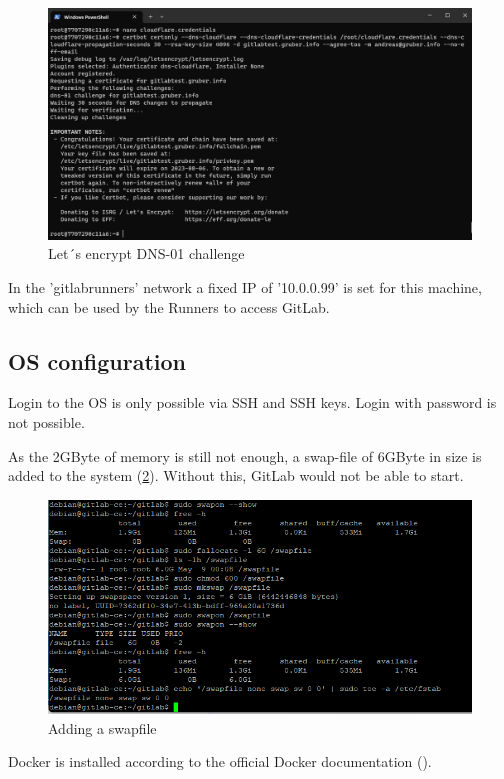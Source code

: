 \begin{figure}[H]
	\centering
	\includegraphics[width=14cm]{images/lets_encrypt.png}
	\caption{Let´s encrypt DNS-01 challenge}
	\label{fig:lets_encrypt}
\end{figure}

In the 'gitlabrunners' network a fixed IP of '10.0.0.99' is set for this machine, which can be used by the Runners to access GitLab.\\

\subsection{OS configuration}

Login to the OS is only possible via SSH and SSH keys. Login with password is not possible. 

As the 2GByte of memory is still not enough, a swap-file of 6GByte in size is added to the system (\ref{fig:swapfile}).
Without this, GitLab would not be able to start.

\begin{figure}[H]
	\centering
	\includegraphics[width=14cm]{images/swapfile.png}
	\caption{Adding a swapfile}
	\label{fig:swapfile}
\end{figure}

Docker is installed according to the official Docker documentation (\cite{refDockerDebian}).
